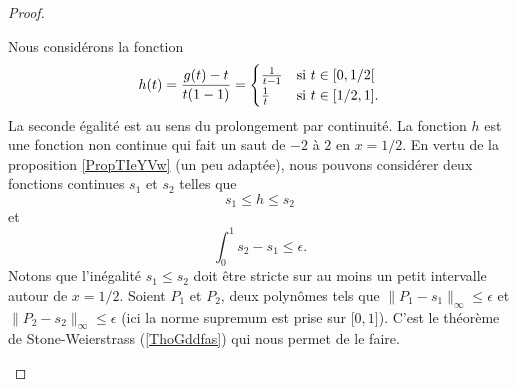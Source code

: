 \begin{proof}
\begin{subproof}
        Nous considérons la fonction
        \begin{equation}
            h(t)=\frac{ g(t)-t }{ t(1-1) }=\begin{cases}
                \frac{1}{ t-1 }    &   \text{si \( t\in \mathopen[ 0 , 1/2 [\)}\\
                \frac{1}{ t }    &    \text{si \( t\in \mathopen[ 1/2 , 1 \mathclose]\)}.
            \end{cases}
        \end{equation}
        La seconde égalité est au sens du prolongement par continuité. La fonction \( h\) est une fonction non continue qui fait un saut de \( -2\) à \( 2\) en \( x=1/2\). En vertu de la proposition \ref{PropTIeYVw} (un peu adaptée), nous pouvons considérer deux fonctions continues \( s_1\) et \( s_2\) telles que
        \begin{equation}
            s_1\leq h\leq s_2
        \end{equation}
        et
        \begin{equation}
            \int_{0}^1s_2-s_1\leq \epsilon.
        \end{equation}
        Notons que l'inégalité \( s_1\leq s_2\) doit être stricte sur au moins un petit intervalle autour de \( x=1/2\). Soient \( P_1\) et \( P_2\), deux polynômes tels que \( \| P_1-s_1 \|_{\infty}\leq \epsilon\) et \( \| P_2-s_2 \|_{\infty}\leq \epsilon\) (ici la norme supremum est prise sur \( \mathopen[ 0 , 1 \mathclose]\)). C'est le théorème de Stone-Weierstrass (\ref{ThoGddfas}) qui nous permet de le faire.


\end{subproof}
\end{proof}
